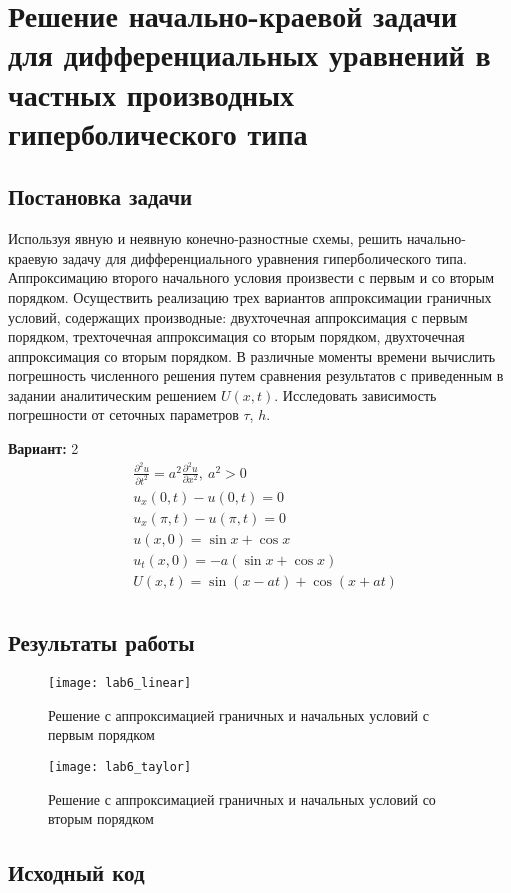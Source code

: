 \section{Решение начально-краевой задачи для дифференциальных уравнений в частных производных гиперболического типа}

\subsection{Постановка задачи}
Используя явную и неявную конечно-разностные схемы, решить начально-краевую задачу для дифференциального уравнения гиперболического типа. Аппроксимацию второго начального условия произвести с первым и со вторым порядком. Осуществить реализацию трех вариантов аппроксимации граничных условий, содержащих производные: двухточечная аппроксимация с первым порядком, трехточечная аппроксимация со вторым порядком, двухточечная аппроксимация со вторым порядком. В различные моменты времени вычислить погрешность численного решения путем сравнения результатов с приведенным в задании аналитическим решением $U(x, t)$. Исследовать зависимость погрешности от сеточных параметров $\tau$, $h$.

{\bfseries Вариант:} 2
\begin{align*}
& \frac{\partial^2 u}{\partial t^2} = a^2 \frac{\partial^2 u}{\partial x^2},\ a^2 > 0 \\
& u_x(0, t) - u(0, t) = 0 \\
& u_x(\pi, t) - u(\pi, t) = 0 \\
& u(x, 0) = \sin x + \cos x \\
& u_t(x, 0) = -a(\sin x + \cos x) \\
& U(x, t) = \sin(x - at) + \cos(x + at) \\
\end{align*}
\pagebreak

\subsection{Результаты работы}
\begin{figure}[h!]
\centering
\texttt{[image: lab6\_linear]}
\caption{Решение с аппроксимацией граничных и начальных условий с первым порядком}
\end{figure}

\vfill

\begin{figure}[h!]
\centering
\texttt{[image: lab6\_taylor]}
\caption{Решение с аппроксимацией граничных и начальных условий со вторым порядком}
\end{figure}
\pagebreak

\subsection{Исходный код}

\pagebreak
